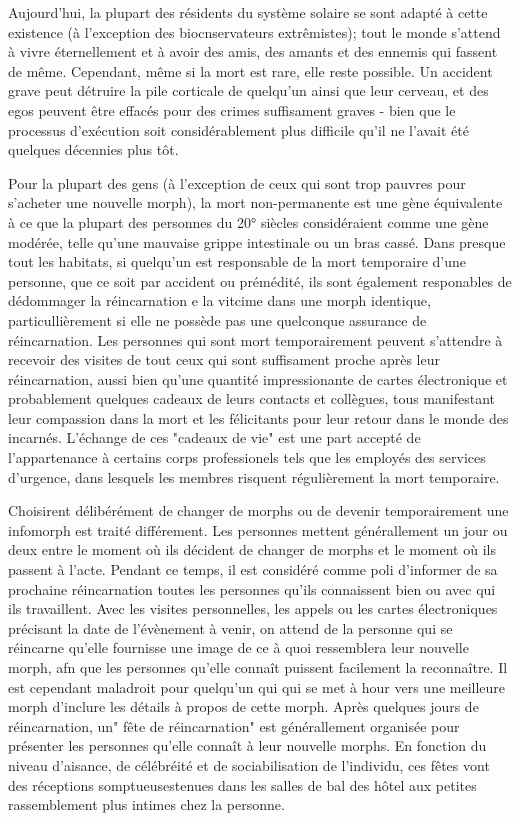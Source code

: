                Aujourd'hui, la plupart des résidents du système solaire se sont adapté à cette existence (à l'exception des biocnservateurs extrêmistes); tout le monde s'attend à vivre éternellement et à avoir des amis, des amants et des ennemis qui fassent de même. Cependant, même si la mort est rare, elle reste possible. Un accident grave peut détruire la pile corticale de quelqu'un ainsi que leur cerveau, et des egos peuvent être effacés pour des crimes suffisament graves - bien que le processus d'exécution soit considérablement plus difficile qu'il ne l'avait été quelques décennies plus tôt. 

               Pour la plupart des gens (à l'exception de ceux qui sont trop pauvres pour s'acheter une nouvelle morph), la mort non-permanente est une gène équivalente à ce que la plupart des personnes du 20° siècles considéraient comme une gène modérée, telle qu'une mauvaise grippe intestinale ou un bras cassé. Dans presque tout les habitats, si quelqu'un est responsable de la mort temporaire d'une personne, que ce soit par accident ou prémédité, ils sont également responables de dédommager la réincarnation e la vitcime dans une morph identique, particullièrement si elle ne possède pas une quelconque assurance de réincarnation. Les personnes qui sont mort temporairement peuvent s'attendre à recevoir des visites de tout ceux qui sont suffisament proche après leur réincarnation, aussi bien qu'une quantité impressionante de cartes électronique et probablement quelques cadeaux de leurs contacts et collègues, tous manifestant leur compassion dans la mort et les félicitants pour leur retour dans le monde des incarnés. L'échange de ces "cadeaux de vie" est une part accepté de l'appartenance à certains corps professionels tels que les employés des services d'urgence, dans lesquels les membres risquent régulièrement la mort temporaire. 

               Choisirent délibérément de changer de morphs ou de devenir temporairement une infomorph est traité différement. Les personnes mettent générallement un jour ou deux entre le moment où ils décident de changer de morphs et le moment où ils passent à l'acte. Pendant ce temps, il est considéré comme poli d'informer de sa prochaine réincarnation toutes les personnes qu'ils connaissent bien ou avec qui ils travaillent. Avec les visites personnelles, les appels ou les cartes électroniques précisant la date de l'évènement à venir, on attend de la personne qui se réincarne qu'elle fournisse une image de ce à quoi ressemblera leur nouvelle morph, afn que les personnes qu'elle connaît puissent facilement la reconnaître. Il est cependant maladroit pour quelqu'un qui qui se met à hour vers une meilleure morph d'inclure les détails à propos de cette morph. Après quelques jours de réincarnation, un" fête de réincarnation" est générallement organisée pour présenter les personnes qu'elle connaît à leur nouvelle morphs. En fonction du niveau d'aisance, de célébréité et de sociabilisation de l'individu, ces fêtes vont des réceptions somptueusestenues dans les salles de bal des hôtel aux petites rassemblement plus intimes chez la personne. 

